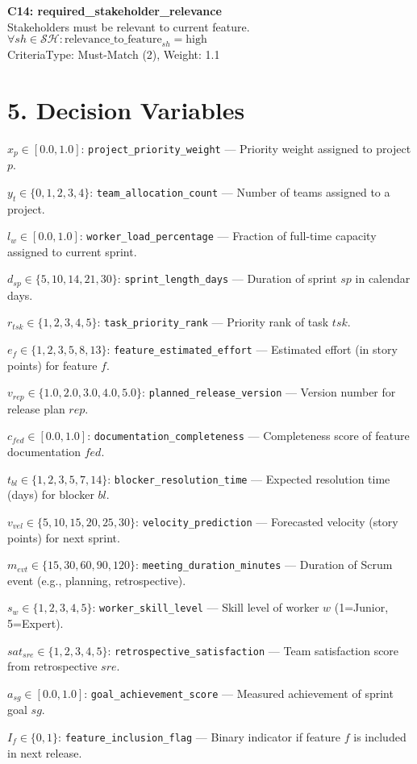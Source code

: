 \documentclass[12pt]{article}
\begin{document}
    \item \textbf{C14: required\_stakeholder\_relevance} \\
    Stakeholders must be relevant to current feature. \\
    $\forall sh \in \mathcal{SH}: \text{relevance\_to\_feature}_{sh} = \text{high}$ \\
    CriteriaType: Must-Match (2), Weight: 1.1

\section{5. Decision Variables}
\item $x_p \in [0.0, 1.0]$: \texttt{project\_priority\_weight} — Priority weight assigned to project $p$.
    \item $y_t \in \{0,1,2,3,4\}$: \texttt{team\_allocation\_count} — Number of teams assigned to a project.
    \item $l_w \in [0.0, 1.0]$: \texttt{worker\_load\_percentage} — Fraction of full-time capacity assigned to current sprint.
    \item $d_{sp} \in \{5,10,14,21,30\}$: \texttt{sprint\_length\_days} — Duration of sprint $sp$ in calendar days.
    \item $r_{tsk} \in \{1,2,3,4,5\}$: \texttt{task\_priority\_rank} — Priority rank of task $tsk$.
    \item $e_f \in \{1,2,3,5,8,13\}$: \texttt{feature\_estimated\_effort} — Estimated effort (in story points) for feature $f$.
    \item $v_{rep} \in \{1.0, 2.0, 3.0, 4.0, 5.0\}$: \texttt{planned\_release\_version} — Version number for release plan $rep$.
    \item $c_{fed} \in [0.0, 1.0]$: \texttt{documentation\_completeness} — Completeness score of feature documentation $fed$.
    \item $t_{bl} \in \{1,2,3,5,7,14\}$: \texttt{blocker\_resolution\_time} — Expected resolution time (days) for blocker $bl$.
    \item $v_{vel} \in \{5,10,15,20,25,30\}$: \texttt{velocity\_prediction} — Forecasted velocity (story points) for next sprint.
    \item $m_{evt} \in \{15,30,60,90,120\}$: \texttt{meeting\_duration\_minutes} — Duration of Scrum event (e.g., planning, retrospective).
    \item $s_w \in \{1,2,3,4,5\}$: \texttt{worker\_skill\_level} — Skill level of worker $w$ (1=Junior, 5=Expert).
    \item $sat_{sre} \in \{1,2,3,4,5\}$: \texttt{retrospective\_satisfaction} — Team satisfaction score from retrospective $sre$.
    \item $a_{sg} \in [0.0, 1.0]$: \texttt{goal\_achievement\_score} — Measured achievement of sprint goal $sg$.
    \item $I_f \in \{0,1\}$: \texttt{feature\_inclusion\_flag} — Binary indicator if feature $f$ is included in next release.
\end{document}
